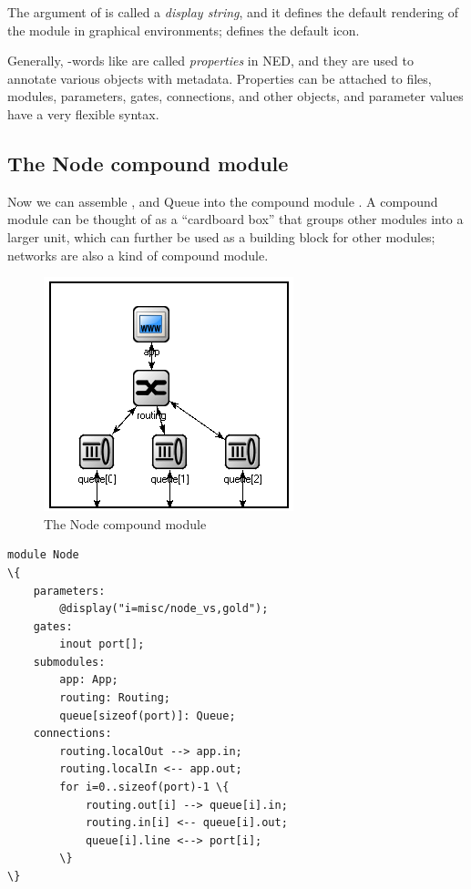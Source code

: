 The argument of  is called a \textit{display string},
and it defines the default rendering of the module in graphical environments;
 defines the default icon.

Generally, -words like  are called \textit{properties}
in NED, and they are used to annotate various objects
with metadata. Properties can be attached to files, modules, parameters, gates,
connections, and other objects, and parameter values have a very flexible
syntax.


\subsection{The Node compound module}

Now we can assemble ,  and {Queue} into the
compound module . A compound module can be thought of as
a ``cardboard box'' that groups other modules into a larger unit,
which can further be used as a building block for other modules;
networks are also a kind of compound module.

\begin{figure}[htbp]
  \centering
  \includegraphics[scale=0.6]{figures/ned-routing-node}
  \caption{The Node compound module}
  \label{fig:ned-routing-node}
\end{figure}

\begin{Verbatim}[commandchars=\\\{\}]
module Node
\{
    parameters:
        @display("i=misc/node_vs,gold");
    gates:
        inout port[];
    submodules:
        app: App;
        routing: Routing;
        queue[sizeof(port)]: Queue;
    connections:
        routing.localOut --> app.in;
        routing.localIn <-- app.out;
        for i=0..sizeof(port)-1 \{
            routing.out[i] --> queue[i].in;
            routing.in[i] <-- queue[i].out;
            queue[i].line <--> port[i];
        \}
\}
\end{Verbatim}

